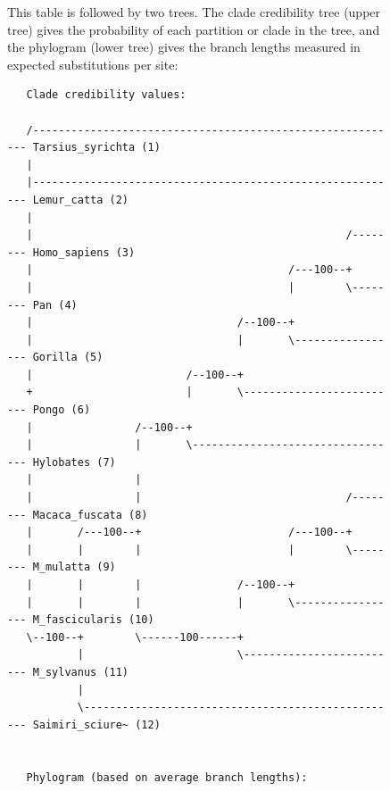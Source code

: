 \documentclass[12pt]{book}
\begin{document}
\begin{figure}[h]
This table is followed by two trees. The clade credibility tree (upper tree) gives the probability
of each partition or clade in the tree, and the phylogram (lower tree) gives the branch lengths
measured in expected substitutions per site:

\begin{singlespacing}
\scriptsize
\begin{verbatim}
   Clade credibility values:

   /---------------------------------------------------------- Tarsius_syrichta (1)
   |                                                                               
   |---------------------------------------------------------- Lemur_catta (2)
   |                                                                               
   |                                                 /-------- Homo_sapiens (3)
   |                                        /---100--+                             
   |                                        |        \-------- Pan (4)
   |                                /--100--+                                      
   |                                |       \----------------- Gorilla (5)
   |                        /--100--+                                              
   +                        |       \------------------------- Pongo (6)
   |                /--100--+                                                      
   |                |       \--------------------------------- Hylobates (7)
   |                |                                                              
   |                |                                /-------- Macaca_fuscata (8)
   |       /---100--+                       /---100--+                             
   |       |        |                       |        \-------- M_mulatta (9)
   |       |        |               /--100--+                                      
   |       |        |               |       \----------------- M_fascicularis (10)
   \--100--+        \------100------+                                              
           |                        \------------------------- M_sylvanus (11)
           |                                                                       
           \-------------------------------------------------- Saimiri_sciure~ (12)
                                                                                   

   Phylogram (based on average branch lengths):


\end{verbatim}
\end{singlespacing}
\end{figure}
\end{document}
